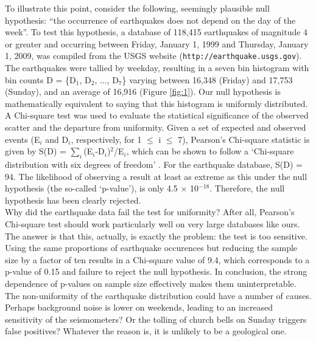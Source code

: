 \documentclass{article}
\begin{document}
To illustrate this point, consider the following, seemingly plausible
null hypothesis: ``the occurrence of earthquakes does not depend on
the day of the week''. To test this hypothesis, a database of 118,415
earthquakes of magnitude 4 or greater and occurring between Friday,
January 1, 1999 and Thursday, January 1, 2009, was compiled from the
USGS website ({\tt http://earth\-quake.usgs.gov}).  The earthquakes
were tallied by weekday, resulting in a seven bin histogram with bin
counts D = \{D$_1$, D$_2$, ..., D$_7$\} varying between 16,348
(Friday) and 17,753 (Sunday), and an average of 16,916 (Figure
\ref{fig:1}).  Our null hypothesis is mathematically equivalent to
saying that this histogram is uniformly distributed. A Chi-square test
was used to evaluate the statistical significance of the observed
scatter and the departure from uniformity. Given a set of expected and
observed events (E$_i$ and D$_i$, respectively, for 1 $\leq$ i $\leq$
7), Pearson's Chi-square statistic is given by S(D) =
$\sum_i$(E$_i$-D$_i$)$^2$/E$_i$, which can be shown to follow a
`Chi-square distribution with six degrees of freedom'
\citep{rice1995}.  For the earthquake database, S(D) = 94. The
likelihood of observing a result at least as extreme as this under the
null hypothesis (the so-called `p-value'), is only 4.5 $\times$
10$^{-18}$.  Therefore, the null hypothesis has been clearly rejected.
\\

Why did the earthquake data fail the test for uniformity? After all,
Pearson's Chi-square test should work particularly well on very large
databases like ours. The answer is that this, actually, is exactly the
problem: the test is too sensitive.  Using the same proportions of
earthquake occurences but reducing the sample size by a factor of ten
results in a Chi-square value of 9.4, which corresponds to a p-value
of 0.15 and failure to reject the null hypothesis.  In conclusion, the
strong dependence of p-values on sample size effectively makes them
uninterpretable.  The non-uniformity of the earthquake distribution
could have a number of causes.  Perhaps background noise is lower on
weekends, leading to an increased sensitivity of the seismometers? Or
the tolling of church bells on Sunday triggers false positives?
Whatever the reason is, it is unlikely to be a geological one.
\end{document}

